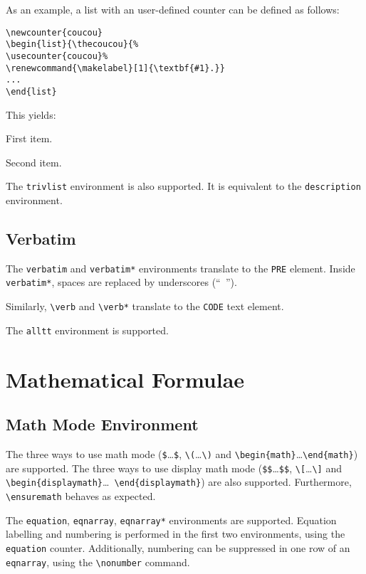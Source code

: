As an example, a list with an user-defined counter can be defined as
follows:
\begin{verbatim}
\newcounter{coucou}
\begin{list}{\thecoucou}{%
\usecounter{coucou}%
\renewcommand{\makelabel}[1]{\textbf{#1}.}}
...
\end{list}
\end{verbatim}
This yields:
\begin{list}
  {\thecoucou}
  {\renewcommand{\makelabel}[1]{\textbf{#1}.}}
\item First item.
\item Second item.
\end{list}


The \verb+trivlist+ environment is also supported. It is equivalent to
the \verb+description+ environment.

\subsection{Verbatim}

The \verb+verbatim+ and \verb+verbatim*+ environments translate to
the \verb+PRE+ element.
Inside \verb+verbatim*+, spaces are replaced by underscores (``\verb*+ +'').


Similarly, \verb+\verb+ and \verb+\verb*+
translate to the \verb+CODE+ text element.

The \verb+alltt+ environment is supported.

\section{Mathematical Formulae}

\subsection{Math Mode Environment}
The three ways to use math mode (\verb+$+\ldots\verb+$+,
\verb+\(+\ldots\verb+\)+ and
\verb+\begin{math}+\ldots\verb+\end{math}+) are supported.
The three ways to use display math mode (\verb+$$+\ldots\verb+$$+,
\verb+\[+\ldots\verb+\]+ and
\verb+\begin{displaymath}+\ldots\ \verb+\end{displaymath}+) are also
supported.
Furthermore, \verb+\ensuremath+ behaves as expected.


The \verb+equation+, \verb+eqnarray+, \verb+eqnarray*+ environments
are supported.
Equation labelling and numbering is performed in the first two
environments, using the \verb+equation+ counter.
Additionally, numbering can be suppressed in one row of an
\verb+eqnarray+, using the \verb+\nonumber+ command.


